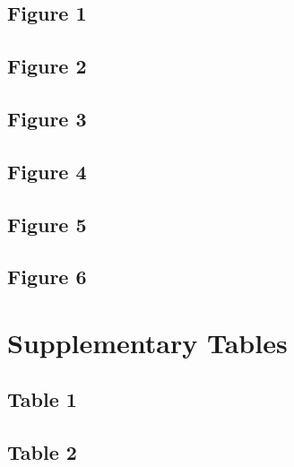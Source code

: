 \documentclass[12pt,twoside]{reedthesis}
\begin{document}
\hypertarget{figure-1-1}{%
\subsection{Figure 1}\label{figure-1-1}}

\newpage

\hypertarget{figure-2-1}{%
\subsection{Figure 2}\label{figure-2-1}}

\newpage

\hypertarget{figure-3-1}{%
\subsection{Figure 3}\label{figure-3-1}}

\newpage

\hypertarget{figure-4-1}{%
\subsection{Figure 4}\label{figure-4-1}}

\newpage

\hypertarget{figure-5-1}{%
\subsection{Figure 5}\label{figure-5-1}}

\newpage

\hypertarget{figure-6-1}{%
\subsection{Figure 6}\label{figure-6-1}}

\newpage

\hypertarget{supplementary-tables}{%
\section{Supplementary Tables}\label{supplementary-tables}}

\hypertarget{table-1}{%
\subsection{Table 1}\label{table-1}}

\newpage

\hypertarget{table-2}{%
\subsection{Table 2}\label{table-2}}
\end{document}
